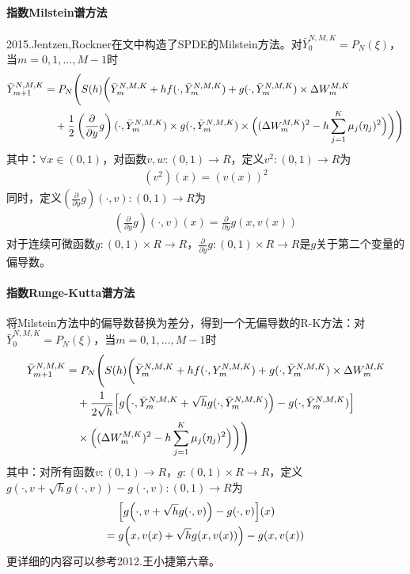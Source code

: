             \paragraph{指数Milstein谱方法}
            2015.Jentzen,Rockner在文\cite{2015.Jentze}中构造了SPDE的Milstein方法。对$\bar{Y}_0^{N,M,K} = P_N(\xi)$，当$m = 0,1,\dots,M-1$时
            \begin{align*}
                \bar{Y}_{m+1}^{N,M,K} &= P_N \Biggl( S(h)\biggl( \bar{Y}_m^{N,M,K} + hf(\cdot,\bar{Y}_m^{N,M,K}) + g(\cdot,\bar{Y}_m^{N,M,K}) \times \Delta W_m^{M,K}\\
                &\quad +\frac 12 \left( \frac{\partial}{\partial y} g\right) (\cdot,\bar{Y}_m^{N,M,K})\times g(\cdot,\bar{Y}_m^{N,M,K}) \times \Bigl((\Delta W_m^{M,K})^2 - h\sum_{j = 1}^K
                \mu_j (\eta_j)^2\Bigr) \biggr)\Biggr)
            \end{align*}
            其中：$\forall x \in (0,1)$，对函数$v,w:(0,1)\rightarrow R$，定义$v^2:(0,1)\rightarrow R$为
            \begin{align*}
            (v^2)(x) = (v(x))^2
            \end{align*}
            同时，定义$(\frac{\partial}{\partial y}g)(\cdot,v):(0,1)\rightarrow R$为
            \begin{align*}
            \left(\frac{\partial}{\partial y}g\right)(\cdot,v)(x) = \frac{\partial}{\partial y}g(x,v(x))
            \end{align*}
            对于连续可微函数$g:(0,1)\times R\rightarrow R$，$\frac{\partial}{\partial y}g:(0,1)\times R \rightarrow R$是$g$关于第二个变量的偏导数。
            \paragraph{指数Runge-Kutta谱方法}
            将Milstein方法中的偏导数替换为差分，得到一个无偏导数的R-K方法：对$\bar{Y}_0^{N,M,K} = P_N(\xi)$，当$m = 0,1,\dots,M-1$时
            \begin{align*}
                \bar{Y}_{m+1}^{N,M,K} &= P_N \Biggl( S(h)\biggl( \bar{Y}_m^{N,M,K} + hf(\cdot,Y_m^{N,M,K})+ g(\cdot,\bar{Y}_m^{N,M,K}) \times \Delta W_m^{M,K}\\
                &\quad +\frac {1}{2\sqrt{h}} \Bigl[ g\Bigl(\cdot,\bar{Y}_m^{N,M,K}+ \sqrt{h} g(\cdot,\bar{Y}_m^{N,M,K}) \Bigr) - g(\cdot,\bar{Y}_m^{N,M,K})\Bigr] \\
                &\quad \times \Bigl((\Delta W_m^{M,K})^2 - h\sum_{j = 1}^K
                \mu_j (\eta_j)^2\Bigr) \biggr)\Biggr)
            \end{align*}
            其中：对所有函数$v:(0,1)\rightarrow R$，$g:(0,1)\times R\rightarrow R$，定义$g(\cdot ,v+\sqrt{h}g(\cdot,v)) - g(\cdot,v):(0,1)\rightarrow R$为
            \begin{align*}
            &\Bigl[g\Bigl(\cdot ,v+\sqrt{h}g(\cdot,v)\Bigr) - g(\cdot,v)\Bigr](x) \\
            ={}& g\Bigl(x,v(x) +\sqrt{h}g(x,v(x))\Bigr) - g(x,v(x))
            \end{align*}
            更详细的内容可以参考2012.王小捷\cite{wang.2012}第六章。
